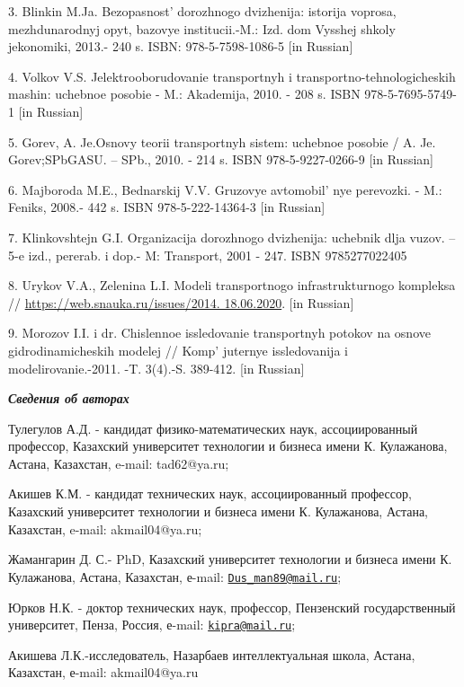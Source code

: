 3. Blinkin M.Ja. Bezopasnost'{} dorozhnogo dvizhenija:
istorija voprosa, mezhdunarodnyj opyt, bazovye institucii.-M.: Izd. dom
Vysshej shkoly jekonomiki, 2013.- 240 s. ISBN: 978-5-7598-1086-5 {[}in
Russian{]}

4. Volkov V.S. Jelektrooborudovanie transportnyh i
transportno-tehnologicheskih mashin: uchebnoe posobie - M.: Akademija,
2010. - 208 s. ISBN 978-5-7695-5749-1 {[}in Russian{]}

5. Gorev, A. Je.Osnovy teorii transportnyh sistem: uchebnoe posobie / A.
Je. Gorev;SPbGASU. -- SPb., 2010. - 214 s. ISBN 978-5-9227-0266-9 {[}in
Russian{]}

6. Majboroda M.E., Bednarskij V.V. Gruzovye
avtomobil' nye perevozki. - M.: Feniks, 2008.- 442 s.
ISBN 978-5-222-14364-3 {[}in Russian{]}

7. Klinkovshtejn G.I. Organizacija dorozhnogo dvizhenija: uchebnik dlja
vuzov. -- 5-e izd., pererab. i dop.- M: Transport, 2001 - 247. ISBN
9785277022405

8. Urykov V.A., Zelenina L.I. Modeli transportnogo infrastrukturnogo
kompleksa //
\href{https://web.snauka.ru/issues/2014.\%2018.06.2020}{https://web.snauka.ru/issues/2014.
18.06.2020}. {[}in Russian{]}

9. Morozov I.I. i dr. Chislennoe issledovanie transportnyh potokov na
osnove gidrodinamicheskih modelej // Komp' juternye
issledovanija i modelirovanie.-2011. -T. 3(4).-S. 389-412. {[}in
Russian{]}

\emph{{\bfseries Сведения об авторах}}

Тулегулов А.Д. - кандидат физико-математических наук, ассоциированный
профессор, Казахский университет технологии и бизнеса имени К.
Кулажанова, Астана, Казахстан, e-mail: tad62@ya.ru;

Акишев К.М. - кандидат технических наук, ассоциированный профессор,
Казахский университет технологии и бизнеса имени К. Кулажанова, Астана,
Казахстан, e-mail: akmail04@ya.ru;

Жамангарин Д. С.- PhD, Казахский университет технологии и бизнеса имени
К. Кулажанова, Астана, Казахстан, е-mail:
\href{mailto:Dus_man89@mail.ru}{\nolinkurl{Dus\_man89@mail.ru}};

Юрков Н.К. - доктор технических наук, профессор, Пензенский
государственный университет, Пенза, Россия, е-mail:
\href{mailto:kipra@mail.ru}{\nolinkurl{kipra@mail.ru}};

Акишева Л.К.-исследователь, Назарбаев интеллектуальная школа, Астана,
Казахстан, е-mail: akmail04@ya.ru


